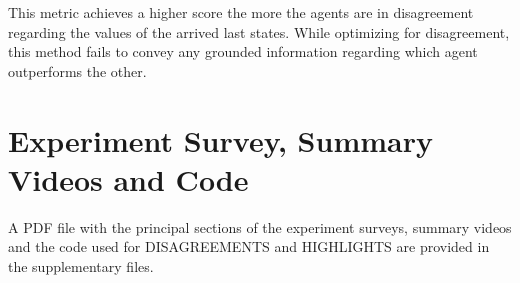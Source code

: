 This metric achieves a higher score the more the agents are in disagreement regarding the values of the arrived last states. 
While optimizing for disagreement, this method fails to convey any grounded information regarding which agent outperforms the other. 

\section{Experiment Survey, Summary Videos and Code}
A PDF file with the principal sections of the experiment surveys, summary videos and the
code used for DISAGREEMENTS and HIGHLIGHTS are provided in the supplementary
files. 



